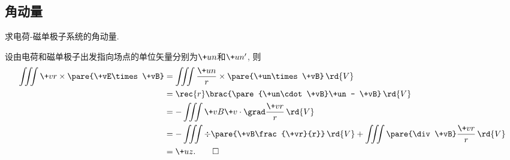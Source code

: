 \documentclass[hidelinks]{ctexart}
\begin{document}


\subsection{角动量} %
\label{sub:角动量}

\begin{ex}
    求电荷-磁单极子系统的角动量.
\end{ex}
\begin{solution}
    设由电荷和磁单极子出发指向场点的单位矢量分别为$\+un$和$\+un'$, 则
    \begin{align*}
        \iiint \+vr\times \pare{\+vE\times \+vB} &= \iiint \frac{\+un}{r}\times \pare{\+un\times \+vB} \,\rd{V} \\
        &= \rec{r}\brac{\pare{\+un\cdot \+vB}\+un - \+vB}\,\rd{V} \\
        &= -\iiint \+vB\+v\cdot \grad \frac{\+vr}{r}\,\rd{V} \\
        &= -\iiint \div\pare{\+vB\frac{\+vr}{r}}\,\rd{V} + \iiint \pare{\div \+vB} \frac{\+vr}{r}\,\rd{V} \\
        &= \+uz. \qedhere
    \end{align*}
\end{solution}


\end{document}
